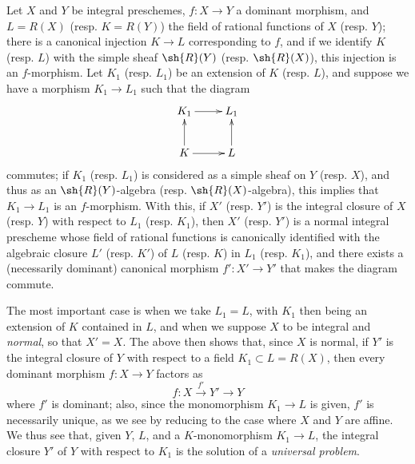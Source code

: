 \begin{env}[6.3.9]
\label{II.6.3.9}
Let $X$ and $Y$ be integral preschemes, $f:X\to Y$ a dominant morphism, and $L=R(X)$ (resp. $K=R(Y)$) the field of rational functions of $X$ (resp. $Y$);
there is a canonical injection $K\to L$ corresponding to $f$, and if we identify $K$ (resp. $L$) with the simple sheaf $\sh{R}(Y)$ (resp. $\sh{R}(X)$), this injection is an $f$-morphism.
Let $K_1$ (resp. $L_1$) be an extension of $K$ (resp. $L$), and suppose we have a morphism $K_1\to L_1$ such that the diagram
\[
  \xymatrix{
    K_1 \ar[r]
    & L_1
  \\K \ar[u] \ar[r]
    & L \ar[u]
  }
\]
commutes;
if $K_1$ (resp. $L_1$) is considered as a simple sheaf on $Y$ (resp. $X$), and thus as an $\sh{R}(Y)$-algebra (resp. $\sh{R}(X)$-algebra), this implies that $K_1\to L_1$ is an $f$-morphism.
With this, if $X'$ (resp. $Y'$) is the integral closure of $X$ (resp. $Y$) with respect to $L_1$ (resp. $K_1$), then $X'$ (resp. $Y'$) is a normal integral prescheme  whose field of rational functions is canonically identified with the algebraic closure $L'$ (resp. $K'$) of $L$ (resp. $K$) in $L_1$ (resp. $K_1$), and there exists a (necessarily dominant) canonical morphism $f':X'\to Y'$ that makes the diagram  commute.

The most important case is when we take $L_1=L$, with $K_1$ then being an extension of $K$ contained in $L$, and when we suppose $X$ to be integral and \emph{normal}, so that $X'=X$.
The above then shows that, since $X$ is normal, if $Y'$ is the integral closure of $Y$ with respect to a field $K_1\subset L=R(X)$, then every dominant morphism $f:X\to Y$ factors as
\[
  f:X\xrightarrow{f'}Y'\to Y
\]
where $f'$ is dominant;
also, since the monomorphism $K_1\to L$ is given, $f'$ is necessarily unique, as we see by reducing to the case where $X$ and $Y$ are affine.
We thus see that, given $Y$, $L$, and a $K$-monomorphism $K_1\to L$, the integral closure $Y'$ of $Y$ with respect to $K_1$ is the solution of a \emph{universal problem}.
\end{env}

